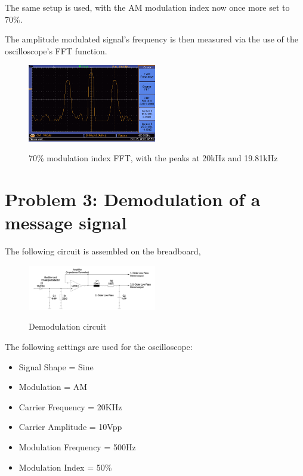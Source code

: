 The same setup is used, with the AM modulation index now once more set to 70\%.

The amplitude modulated signal's frequency is then measured via the use of the oscilloscope's FFT function.

\begin{figure}[H]
    \centering
    \includegraphics[width=0.5\textwidth]{images/execution_02_07_fft.png}
    \label{fig:execution_02_07_fft}
    \caption{70\% modulation index FFT, with the peaks at 20kHz and 19.81kHz}
\end{figure}
\newpage
\section{Problem 3: Demodulation of a message signal}

The following circuit is assembled on the breadboard,
\begin{figure}[H]
    \centering
    \includegraphics[width=0.5\textwidth]{images/execution_03_circuit.png}
    \label{fig:execution_03_circuit}
    \caption{Demodulation circuit}
\end{figure}

The following settings are used for the oscilloscope:
\begin{itemize}
    \item Signal Shape = Sine
    \item Modulation = AM
    \item Carrier Frequency = 20KHz
    \item Carrier Amplitude = 10Vpp
    \item Modulation Frequency = 500Hz
    \item Modulation Index = 50\%
\end{itemize}

